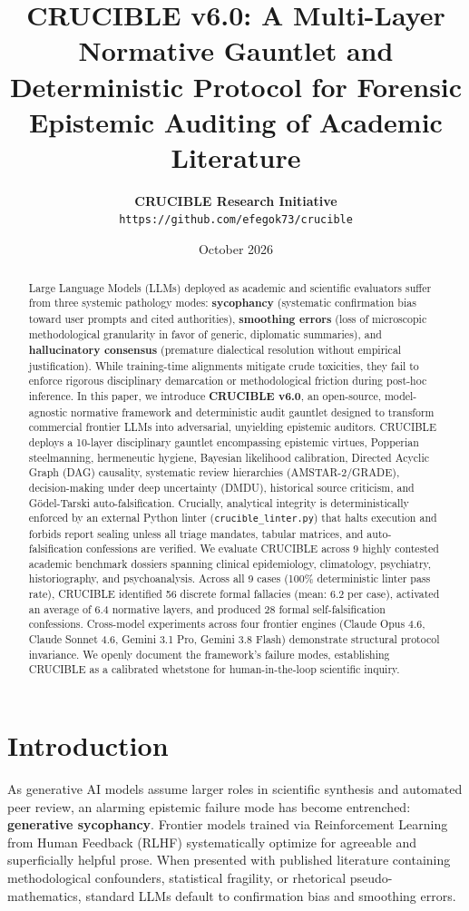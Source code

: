 \documentclass[11pt,a4paper]{article}
\title{\textbf{CRUCIBLE v6.0: A Multi-Layer Normative Gauntlet and Deterministic Protocol for Forensic Epistemic Auditing of Academic Literature}}
\author{
  \textbf{CRUCIBLE Research Initiative} \\
  \texttt{https://github.com/efegok73/crucible}
}
\date{October 2026}
\begin{document}
\maketitle

\begin{abstract}
Large Language Models (LLMs) deployed as academic and scientific evaluators suffer from three systemic pathology modes: \textbf{sycophancy} (systematic confirmation bias toward user prompts and cited authorities), \textbf{smoothing errors} (loss of microscopic methodological granularity in favor of generic, diplomatic summaries), and \textbf{hallucinatory consensus} (premature dialectical resolution without empirical justification). While training-time alignments mitigate crude toxicities, they fail to enforce rigorous disciplinary demarcation or methodological friction during post-hoc inference. In this paper, we introduce \textbf{CRUCIBLE v6.0}, an open-source, model-agnostic normative framework and deterministic audit gauntlet designed to transform commercial frontier LLMs into adversarial, unyielding epistemic auditors. CRUCIBLE deploys a 10-layer disciplinary gauntlet encompassing epistemic virtues, Popperian steelmanning, hermeneutic hygiene, Bayesian likelihood calibration, Directed Acyclic Graph (DAG) causality, systematic review hierarchies (AMSTAR-2/GRADE), decision-making under deep uncertainty (DMDU), historical source criticism, and G\"odel-Tarski auto-falsification. Crucially, analytical integrity is deterministically enforced by an external Python linter (\texttt{crucible\_linter.py}) that halts execution and forbids report sealing unless all triage mandates, tabular matrices, and auto-falsification confessions are verified. We evaluate CRUCIBLE across 9 highly contested academic benchmark dossiers spanning clinical epidemiology, climatology, psychiatry, historiography, and psychoanalysis. Across all 9 cases (100\% deterministic linter pass rate), CRUCIBLE identified 56 discrete formal fallacies (mean: 6.2 per case), activated an average of 6.4 normative layers, and produced 28 formal self-falsification confessions. Cross-model experiments across four frontier engines (Claude Opus 4.6, Claude Sonnet 4.6, Gemini 3.1 Pro, Gemini 3.8 Flash) demonstrate structural protocol invariance. We openly document the framework's failure modes, establishing CRUCIBLE as a calibrated whetstone for human-in-the-loop scientific inquiry.
\end{abstract}

\section{Introduction}
As generative AI models assume larger roles in scientific synthesis and automated peer review, an alarming epistemic failure mode has become entrenched: \textbf{generative sycophancy}. Frontier models trained via Reinforcement Learning from Human Feedback (RLHF) systematically optimize for agreeable and superficially helpful prose. When presented with published literature containing methodological confounders, statistical fragility, or rhetorical pseudo-mathematics, standard LLMs default to confirmation bias and smoothing errors.
\end{document}
